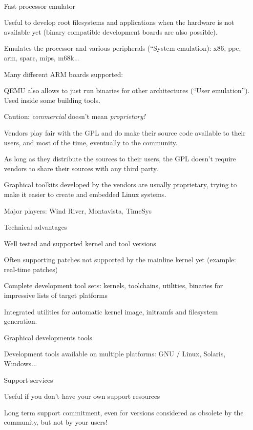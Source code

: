   \\
  Fast processor emulator
  \startitemize
  \item Useful to develop root filesystems and applications when the
    hardware is not available yet (binary compatible development
    boards are also possible).
  \item Emulates the processor and various peripherals (“System
    emulation): x86, ppc, arm, sparc, mips, m68k...
  \item Many different ARM boards supported:\\
  \item QEMU also allows to just run binaries for other architectures
    (``User emulation''). Used inside some building tools.
  \stopitemize

  Caution: {\em commercial} doesn't mean {\em proprietary!}
  \startitemize
  \item Vendors play fair with the GPL and do make their source code
    available to their users, and most of the time, eventually to the
    community.
    \startitemize
    \item As long as they distribute the sources to their users, the
      GPL doesn't require vendors to share their sources with any
      third party.
    \stopitemize
  \item Graphical toolkits developed by the vendors are usually
    proprietary, trying to make it easier to create and embedded Linux
    systems.
  \item Major players: Wind River, Montavista, TimeSys
  \stopitemize

    \startitemize
    \item Technical advantages
      \startitemize
      \item Well tested and supported kernel and tool versions
      \item Often supporting patches not supported by the
        mainline kernel yet (example: real-time patches)
      \stopitemize
    \item Complete development tool sets: kernels, toolchains,
      utilities, binaries for impressive lists of target platforms
    \item Integrated utilities for automatic kernel image, initramfs
      and filesystem generation.
    \stopitemize
    \startitemize
    \item Graphical developments tools
    \item Development tools available on multiple platforms: GNU /
      Linux, Solaris, Windows...
    \item Support services
      \startitemize
      \item Useful if you don't have your own support resources
      \item Long term support commitment, even for versions considered
        as obsolete by the community, but not by your users!
      \stopitemize
    \stopitemize

